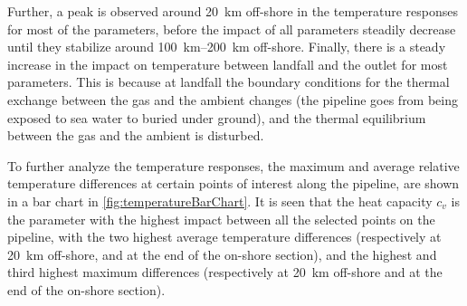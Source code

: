 Further, a peak is observed around \SI{20}{\kilo\meter} off-shore in the temperature responses for most of the parameters, before the impact of all parameters steadily decrease until they stabilize around \SIrange{100}{200}{\kilo\meter} off-shore. Finally, there is a steady increase in the impact on temperature between landfall and the outlet for most parameters. This is because at landfall the boundary conditions for the thermal exchange between the gas and the ambient changes (the pipeline goes from being exposed to sea water to buried under ground), and the thermal equilibrium between the gas and the ambient is disturbed. %



To further analyze the temperature responses, the maximum and average relative temperature differences at certain points of interest along the pipeline, are shown in a bar chart in \cref{fig:temperatureBarChart}. %
It is seen that the heat capacity $c_v$ is the parameter with the highest impact between all the selected points on the pipeline, with the two highest average temperature differences (respectively at \SI{20}{\kilo\meter} off-shore, and at the end of the on-shore section), and the highest and third highest maximum differences (respectively at \SI{20}{\kilo\meter} off-shore and at the end of the on-shore section). 

